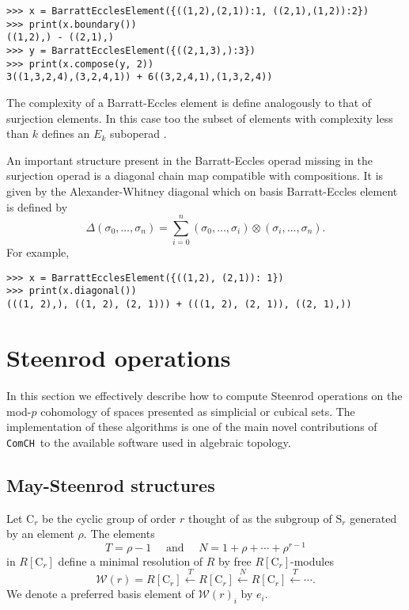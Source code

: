 \documentclass{amsart}
\renewcommand{\S}{\mathrm{S}}
\newcommand{\C}{\mathrm{C}}
\newcommand{\comch}{\texttt{ComCH}}
\begin{document}
\begin{Verbatim}[frame=lines, samepage=true]
>>> x = BarrattEcclesElement({((1,2),(2,1)):1, ((2,1),(1,2)):2})
>>> print(x.boundary())
((1,2),) - ((2,1),)
>>> y = BarrattEcclesElement({((2,1,3),):3})
>>> print(x.compose(y, 2))
3((1,3,2,4),(3,2,4,1)) + 6((3,2,4,1),(1,3,2,4))
\end{Verbatim}

The complexity of a Barratt-Eccles element is define analogously to that of surjection elements.
In this case too the subset of elements with complexity less than $k$ defines an $E_k$ suboperad \cite{BergerFresse04}.

An important structure present in the Barratt-Eccles operad missing in the surjection operad is a diagonal chain map compatible with compositions.
It is given by the Alexander-Whitney diagonal which on basis Barratt-Eccles element is defined by
\begin{equation*}
\Delta(\sigma_0, \dots, \sigma_n) = \sum_{i=0}^n (\sigma_0, \dots, \sigma_i) \otimes (\sigma_i, \dots, \sigma_n).
\end{equation*}
For example,

\begin{Verbatim}[frame=lines, samepage=true]
>>> x = BarrattEcclesElement({((1,2), (2,1)): 1})
>>> print(x.diagonal())
(((1, 2),), ((1, 2), (2, 1))) + (((1, 2), (2, 1)), ((2, 1),))
\end{Verbatim}

\section{Steenrod operations} \label{s: steenrod operations}

In this section we effectively describe how to compute Steenrod operations on the mod-$p$ cohomology of spaces presented as simplicial or cubical sets.
The implementation of these algorithms is one of the main novel contributions of \comch\, to the available software used in algebraic topology.

\subsection{May-Steenrod structures}

Let $\C_r$ be the cyclic group of order $r$ thought of as the subgroup of $\S_r$ generated by an element $\rho$.
The elements
\begin{equation*}
T = \rho-1 \quad \text{ and } \quad N = 1+\rho+\cdots+\rho^{r-1}
\end{equation*}
in $R[\C_r]$ define a minimal resolution of $R$ by free $R[\C_r]$-modules
\begin{equation*}
\mathcal W(r) = R[\C_r] \stackrel{T}{\longleftarrow} R[\C_r] \stackrel{N}{\longleftarrow} R[\C_r] \stackrel{T}{\longleftarrow} \cdots.
\end{equation*}
We denote a preferred basis element of $\mathcal W(r)_i$ by $e_i$.
\end{document}

